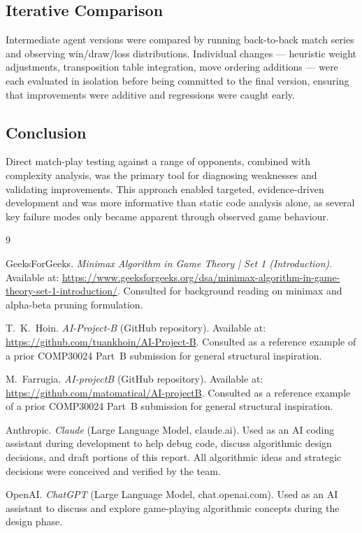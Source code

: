 \documentclass[10pt,a4paper]{article}
\begin{document}
\subsection{Iterative Comparison}

Intermediate agent versions were compared by running back-to-back match series and observing win/draw/loss distributions. Individual changes --- heuristic weight adjustments, transposition table integration, move ordering additions --- were each evaluated in isolation before being committed to the final version, ensuring that improvements were additive and regressions were caught early.

\subsection{Conclusion}

Direct match-play testing against a range of opponents, combined with complexity analysis, was the primary tool for diagnosing weaknesses and validating improvements. This approach enabled targeted, evidence-driven development and was more informative than static code analysis alone, as several key failure modes only became apparent through observed game behaviour.

\newpage
\begin{thebibliography}{9}

GeeksForGeeks.
\textit{Minimax Algorithm in Game Theory | Set 1 (Introduction)}.
Available at: \url{https://www.geeksforgeeks.org/dsa/minimax-algorithm-in-game-theory-set-1-introduction/}.
Consulted for background reading on minimax and alpha-beta pruning formulation.

T.\ K.\ Hoin.
\textit{AI-Project-B} (GitHub repository).
Available at: \url{https://github.com/tuankhoin/AI-Project-B}.
Consulted as a reference example of a prior COMP30024 Part~B submission for general structural inspiration.

M.\ Farrugia.
\textit{AI-projectB} (GitHub repository).
Available at: \url{https://github.com/matomatical/AI-projectB}.
Consulted as a reference example of a prior COMP30024 Part~B submission for general structural inspiration.

Anthropic.
\textit{Claude} (Large Language Model, claude.ai).
Used as an AI coding assistant during development to help debug code, discuss algorithmic design decisions, and draft portions of this report. All algorithmic ideas and strategic decisions were conceived and verified by the team.

OpenAI.
\textit{ChatGPT} (Large Language Model, chat.openai.com).
Used as an AI assistant to discuss and explore game-playing algorithmic concepts during the design phase.

\end{thebibliography}
\end{document}

